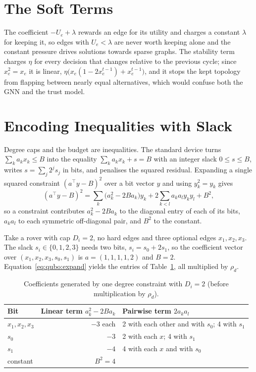 \section{The Soft Terms}

The coefficient $-U_e+\lambda$ rewards an edge for its utility and charges a
constant $\lambda$ for keeping it, so edges with $U_e<\lambda$ are never worth
keeping alone and the constant pressure drives solutions towards sparse
graphs. The stability term charges $\eta$ for every decision that changes
relative to the previous cycle; since $x_e^2=x_e$ it is linear,
$\eta\bigl(x_e(1-2x_e^{t-1})+x_e^{t-1}\bigr)$, and it stops the kept topology
from flapping between nearly equal alternatives, which would confuse both the
GNN and the trust model.

\section{Encoding Inequalities with Slack}

Degree caps and the budget are inequalities. The standard device turns
$\sum_k a_kx_k\le B$ into the equality $\sum_k a_kx_k+s=B$ with an integer
slack $0\le s\le B$, writes $s=\sum_j 2^js_j$ in bits, and penalises the
squared residual. Expanding a single squared constraint
$(a^{\top}y-B)^2$ over a bit vector $y$ and using $y_k^2=y_k$ gives
\begin{equation}
(a^{\top}y-B)^2=\sum_k\bigl(a_k^2-2Ba_k\bigr)y_k+2\sum_{k<l}a_ka_ly_ky_l+B^2,
\label{eq:qubo:expand}
\end{equation}
so a constraint contributes $a_k^2-2Ba_k$ to the diagonal entry of each of its
bits, $a_ka_l$ to each symmetric off-diagonal pair, and $B^2$ to the
constant.

\begin{example}
Take a rover with cap $D_i=2$, no hard edges and three optional edges
$x_1,x_2,x_3$. The slack $s_i\in\{0,1,2,3\}$ needs two bits, $s_i=s_0+2s_1$,
so the coefficient vector over $(x_1,x_2,x_3,s_0,s_1)$ is $a=(1,1,1,1,2)$ and
$B=2$. Equation~\eqref{eq:qubo:expand} yields the entries of
Table~\ref{tab:qubo:degree}, all multiplied by $\rho_d$.
\end{example}

\begin{table}[htbp]
\centering
\caption{Coefficients generated by one degree constraint with $D_i=2$
(before multiplication by $\rho_d$).}
\label{tab:qubo:degree}
\small
\begin{tabular}{@{}l r l@{}}
\toprule
Bit & Linear term $a_k^2-2Ba_k$ & Pairwise term $2a_ka_l$ \\
\midrule
$x_1,x_2,x_3$ & $-3$ each & 2 with each other and with $s_0$; 4 with $s_1$ \\
$s_0$ & $-3$ & 2 with each $x$; 4 with $s_1$ \\
$s_1$ & $-4$ & 4 with each $x$ and with $s_0$ \\
constant & $B^2=4$ & \\
\bottomrule
\end{tabular}
\end{table}

